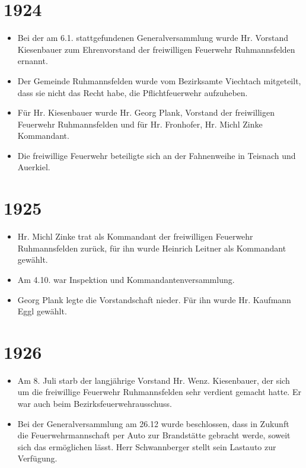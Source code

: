 \documentclass[12pt,a4paper]{book}
\begin{document}
\section*{1924}

\begin{itemize}
\item Bei der am 6.1. stattgefundenen Generalversammlung wurde Hr. Vorstand
Kiesenbauer zum Ehrenvorstand der freiwilligen Feuerwehr Ruhmannsfelden ernannt.

\item Der Gemeinde Ruhmannsfelden wurde vom Bezirksamte Viechtach mitgeteilt,
dass sie nicht das Recht habe, die Pflichtfeuerwehr aufzuheben.

\item Für Hr. Kiesenbauer wurde Hr. Georg Plank, Vorstand der freiwilligen
Feuerwehr Ruhmannsfelden und für Hr. Fronhofer, Hr. Michl Zinke Kommandant.

\item Die freiwillige Feuerwehr beteiligte sich an der Fahnenweihe in Teisnach
und Auerkiel.
\end{itemize}

\section*{1925}

\begin{itemize}
\item Hr. Michl Zinke trat als Kommandant der freiwilligen Feuerwehr
Ruhmannsfelden zurück, für ihn wurde Heinrich Leitner als Kommandant gewählt.

\item Am 4.10. war Inspektion und Kommandantenversammlung.

\item Georg Plank legte die Vorstandschaft nieder. Für ihn wurde Hr. Kaufmann
Eggl gewählt.
\end{itemize}

\section*{1926}

\begin{itemize}
\item Am 8. Juli starb der langjährige Vorstand Hr. Wenz. Kiesenbauer, der sich
um die freiwillige Feuerwehr Ruhmannsfelden sehr verdient gemacht hatte. Er war
auch beim Bezirksfeuerwehrausschuss.

\item Bei der Generalversammlung am 26.12 wurde beschlossen, dass in Zukunft die
Feuerwehrmannschaft per Auto zur Brandstätte gebracht werde, soweit sich das
ermöglichen lässt. Herr Schwannberger stellt sein Lastauto zur Verfügung.
\end{itemize}
\end{document}
